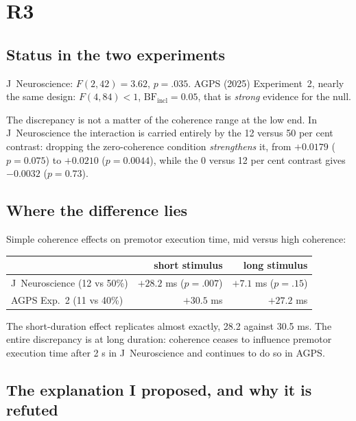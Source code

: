 \documentclass[11pt,a4paper]{article}
\theoremstyle{plain}
\theoremstyle{remark}
\begin{document}
\section{R3}
\label{sec:R3}

\subsection{Status in the two experiments}

J~Neuroscience: $F(2,42)=3.62$, $p=.035$. AGPS (2025) Experiment~2, nearly the same design:
$F(4,84)<1$, $\mathrm{BF}_{\text{incl}}=0.05$, that is \emph{strong} evidence for the null.

The discrepancy is not a matter of the coherence range at the low end. In J~Neuroscience the
interaction is carried entirely by the 12 versus 50 per cent contrast: dropping the
zero-coherence condition \emph{strengthens} it, from $+0.0179$ ($p=0.075$) to $+0.0210$
($p=0.0044$), while the 0 versus 12 per cent contrast gives $-0.0032$ ($p=0.73$).

\subsection{Where the difference lies}

Simple coherence effects on premotor execution time, mid versus high coherence:

\begin{center}
\begin{tabular}{lrr}
\toprule
& short stimulus & long stimulus\\
\midrule
J~Neuroscience (12 vs 50\%) & $+28.2$ ms ($p=.007$) & $+7.1$ ms ($p=.15$)\\
AGPS Exp.~2 (11 vs 40\%) & $+30.5$ ms & $+27.2$ ms\\
\bottomrule
\end{tabular}
\end{center}

The short-duration effect replicates almost exactly, 28.2 against 30.5 ms. The entire
discrepancy is at long duration: coherence ceases to influence premotor execution time after
2 s in J~Neuroscience and continues to do so in AGPS.

\subsection{The explanation I proposed, and why it is refuted}
\end{document}
